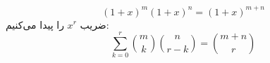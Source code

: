 \p
$$(1 + x)^m(1 + x)^n = (1 + x)^{m+n}$$
ضریب
$x^r$
را پیدا می‌کنیم:
$$\sum_{k=0}^{r} \binom{m}{k} \binom{n}{r-k} = \binom{m+n}{r}$$